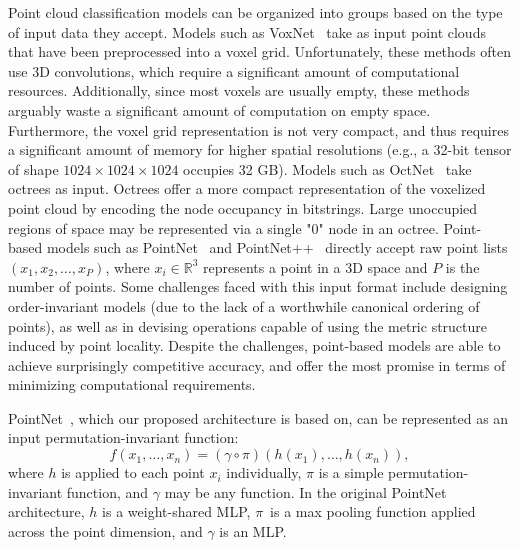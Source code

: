 Point cloud classification models can be organized into groups based on the type of input data they accept.
Models such as VoxNet~\cite{maturana2015voxnet} take as input point clouds that have been preprocessed into a voxel grid.
Unfortunately, these methods often use 3D convolutions, which require a significant amount of computational resources.
Additionally, since most voxels are usually empty, these methods arguably waste a significant amount of computation on empty space.
Furthermore, the voxel grid representation is not very compact, and thus requires a significant amount of memory for higher spatial resolutions (e.g., a 32-bit tensor of shape $1024 \times 1024 \times 1024$ occupies 32 GB).
Models such as OctNet~\cite{riegler2016octnet} take octrees as input.
Octrees offer a more compact representation of the voxelized point cloud by encoding the node occupancy in bitstrings.
Large unoccupied regions of space may be represented via a single "0" node in an octree.
Point-based models such as PointNet~\cite{qi2016pointnet} and PointNet++~\cite{qi2017pointnetplusplus} directly accept raw point lists $(x_1, x_2, \ldots, x_P)$, where $x_i \in \mathbb{R}^3$ represents a point in a 3D space and $P$ is the number of points.
Some challenges faced with this input format include designing order-invariant models (due to the lack of a worthwhile canonical ordering of points),
as well as in devising operations capable of using the metric structure induced by point locality.
Despite the challenges, point-based models are able to achieve surprisingly competitive accuracy,
and offer the most promise in terms of minimizing computational requirements.


PointNet~\cite{qi2016pointnet}, which our proposed architecture is based on, can be represented as an input permutation-invariant function:
\[ f(x_1, \ldots, x_n) = (\gamma \circ \pi)(h(x_1), \ldots, h(x_n)), \]
where $h$ is applied to each point $x_i$ individually, $\pi$ is a simple permutation-invariant function, and $\gamma$ may be any function.
In the original PointNet architecture, $h$ is a weight-shared MLP, $\pi$~is a max pooling function applied across the point dimension, and $\gamma$ is an MLP.

